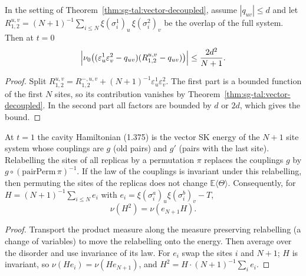 \begin{theorem}[$\nu_0(f)=O(1/N)$]\label{thm:sg-tal:vector-overlap-bound}
\leanok
{}
In the setting of Theorem~\ref{thm:sg-tal:vector-decoupled}, assume $|q_{uv}|\le d$ and let $R^{u,v}_{1,2}=(N+1)^{-1}\sum_{i\le N}\xi(\sigma^1_i)_u\,\xi(\sigma^2_i)_v$ be the overlap of the full system. Then at $t=0$
\[
\Bigl|\nu_0\bigl((\varepsilon^1_u\varepsilon^2_v-q_{uv})(R^{u,v}_{1,2}-q_{uv})\bigr)\Bigr|\le\frac{2d^2}{N+1}.
\]
\end{theorem}
\begin{proof}
\leanok
Split $R^{u,v}_{1,2}=R^{-,u,v}_{1,2}+(N+1)^{-1}\varepsilon^1_u\varepsilon^2_v$. The first part is a bounded function of the first $N$ sites, so its contribution vanishes by Theorem~\ref{thm:sg-tal:vector-decoupled}. In the second part all factors are bounded by $d$ or $2d$, which gives the bound.
\end{proof}

\begin{lemma}\label{lem:sg-tal:vector-site-symmetry}
\leanok
{}
At $t=1$ the cavity Hamiltonian (1.375) is the vector SK energy of the $N+1$ site system whose couplings are $g$ (old pairs) and $g'$ (pairs with the last site). Relabelling the sites of all replicas by a permutation $\pi$ replaces the couplings $g$ by $g\circ(\mathrm{pairPerm}\,\pi)^{-1}$. If the law of the couplings is invariant under this relabelling, then permuting the sites of the replicas does not change $\mathbb E\langle\Theta\rangle$. Consequently, for $H=(N+1)^{-1}\sum_{i\le N}e_i$ with $e_i=\xi(\sigma^a_i)_u\xi(\sigma^b_i)_v-T$,
\[
\nu(H^2)=\nu(e_{N+1}H).
\]
\end{lemma}
\begin{proof}
\leanok
Transport the product measure along the measure preserving relabelling (a change of variables) to move the relabelling onto the energy. Then average over the disorder and use invariance of its law. For $e_i$ swap the sites $i$ and $N+1$; $H$ is invariant, so $\nu(He_i)=\nu(He_{N+1})$, and $H^2=H\cdot(N+1)^{-1}\sum_ie_i$.
\end{proof}

